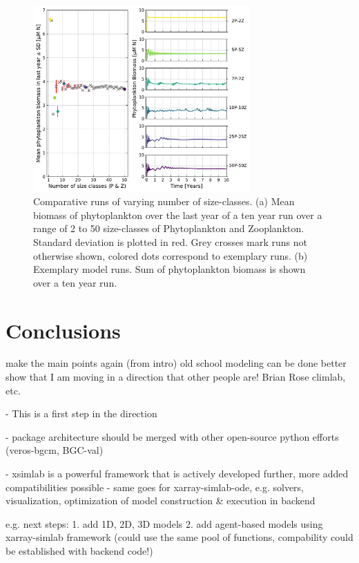 \documentclass[journal abbreviation, manuscript]{copernicus}
\begin{document}
\begin{figure}[t]
\includegraphics[width=8.3cm]{Figures/firstdraft_plots/03_ASTroCAT_sizeclassrange.pdf}
\caption{Comparative runs of varying number of size-classes. (a) Mean biomass of phytoplankton over the last year of a ten year run over a range of 2 to 50 size-classes of Phytoplankton and Zooplankton. Standard deviation is plotted in red. Grey crosses mark runs not otherwise shown, colored dots correspond to exemplary runs. (b) Exemplary model runs. Sum of phytoplankton biomass is shown over a ten year run.}
\label{Figure:ResultsASTroCAT_2}
\end{figure}


\section{Conclusions}
\conclusions  %

make the main points again (from intro)
old school modeling can be done better
show that I am moving in a direction that other people are! Brian Rose climlab, etc.

- This is a first step in the direction

- package architecture should be merged with other open-source python efforts (veros-bgcm, BGC-val)

- xsimlab is a powerful framework that is actively developed further, more added compatibilities possible
- same goes for xarray-simlab-ode, e.g. solvers, visualization, optimization of model construction & execution in backend

e.g. next steps: 1. add 1D, 2D, 3D models 2. add agent-based models using xarray-simlab framework (could use the same pool of functions, compability could be established with backend code!)
\end{document}

